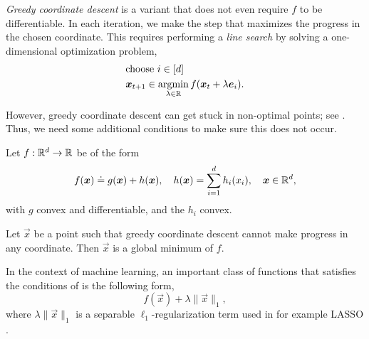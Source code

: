 \textit{Greedy coordinate descent} is a variant that does not even require $f$ to be differentiable.
In each iteration, we make the step that maximizes the progress in the chosen coordinate. This
requires performing a \textit{line search} by solving a one-dimensional optimization problem,
\begin{align*}
     & \text{choose $i \in [d]$}                                                    \\
     & \bm{x}_{t+1} \in \operatorname*{argmin}_{\lambda \in \mathbb{R}} f(\bm{x}_t + \lambda \bm{e}_i).
\end{align*}

However, greedy coordinate descent can get stuck in non-optimal points; see .
Thus, we need some additional conditions to make sure this does not occur.

\begin{theorem} \label{thm:separable}
    Let $f: \mathbb{R}^d \to \mathbb{R}$ be of the form \[
        f(\bm{x}) \doteq g(\bm{x}) + h(\bm{x}), \quad h(\bm{x}) = \sum_{i=1}^{d} h_i(x_i), \quad \bm{x} \in \mathbb{R}^d,
    \]
    with $g$ convex and differentiable, and the $h_i$ convex.

    Let $\vec{x}$ be a point such that greedy coordinate descent cannot make progress in any
    coordinate. Then $\vec{x}$ is a global minimum of $f$.
\end{theorem}

In the context of machine learning, an important class of functions that satisfies the conditions
of  is the following form, \[
    f(\vec{x}) + \lambda \| \vec{x} \|_1,
\]
where $\lambda \| \vec{x} \|_1$ is a separable $\ell_1$-regularization term used in for example
LASSO \citep{tibshirani1996regression}.
